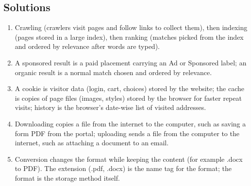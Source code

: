 \documentclass[11pt]{article}
\begin{document}
\subsection*{Solutions}
\begingroup\small
\begin{enumerate}[label=\arabic*.]
  \item Crawling (crawlers visit pages and follow links to collect them),
    then indexing (pages stored in a large index), then ranking (matches
    picked from the index and ordered by relevance after words are typed).
  \item A sponsored result is a paid placement carrying an Ad or Sponsored
    label; an organic result is a normal match chosen and ordered by
    relevance.
  \item A cookie is visitor data (login, cart, choices) stored by the
    website; the cache is copies of page files (images, styles) stored by
    the browser for faster repeat visits; history is the browser's
    date-wise list of visited addresses.
  \item Downloading copies a file from the internet to the computer, such as
    saving a form PDF from the portal; uploading sends a file from the
    computer to the internet, such as attaching a document to an email.
  \item Conversion changes the format while keeping the content (for example
    .docx to PDF). The extension (.pdf, .docx) is the name tag for the
    format; the format is the storage method itself.
\end{enumerate}
\endgroup
\end{document}
